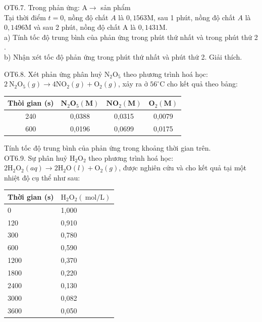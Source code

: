 \documentclass[10pt]{article}
\begin{document}
OT6.7. Trong phản ứng: $\mathrm{A} \rightarrow$ sản phẩm\\
Tại thời điểm $t=0$, nồng độ chất $A$ là $0,1563 \mathrm{M}$, sau 1 phút, nồng độ chất $A$ là $0,1496 \mathrm{M}$ và sau 2 phút, nồng độ chất A là $0,1431 \mathrm{M}$.\\
a) Tính tốc độ trung bình của phản ứng trong phút thứ nhất và trong phút thứ 2 .\\
b) Nhận xét tốc độ phản ứng trong phút thứ nhất và phút thứ 2. Giải thích.

OT6.8. Xét phản ứng phân huỷ $\mathrm{N}_{2} \mathrm{O}_{5}$ theo phương trình hoá học:\\
$2 \mathrm{~N}_{2} \mathrm{O}_{5}(g) \rightarrow 4 \mathrm{NO}_{2}(g)+\mathrm{O}_{2}(g)$, xảy ra ở $56^{\circ} \mathrm{C}$ cho kết quả theo bảng:

\begin{center}
\begin{tabular}{|c|c|c|c|}
\hline
Thòi gian (s) & $\mathbf{N}_{2} \mathbf{O}_{5} \mathbf{( M )}$ & $\mathbf{N O}_{2} \mathbf{( M )}$ & $\mathbf{O}_{2} \mathbf{( M )}$ \\
\hline
240 & 0,0388 & 0,0315 & 0,0079 \\
\hline
600 & 0,0196 & 0,0699 & 0,0175 \\
\hline
\end{tabular}
\end{center}

Tính tốc độ trung bình của phản ứng trong khoảng thời gian trên.\\
OT6.9. Sự phân huỷ $\mathrm{H}_{2} \mathrm{O}_{2}$ theo phương trình hoá học: $2 \mathrm{H}_{2} \mathrm{O}_{2}(a q) \rightarrow 2 \mathrm{H}_{2} \mathrm{O}(l)+\mathrm{O}_{2}(g)$, được nghiên cứu và cho kết quả tại một nhiệt độ cụ thể như sau:

\begin{center}
\begin{tabular}{|l|l|}
\hline
Thời gian (s) & $\mathrm{H}_{2} \mathrm{O}_{2}(\mathrm{~mol} / \mathrm{L})$ \\
\hline
0 & 1,000 \\
\hline
120 & 0,910 \\
\hline
300 & 0,780 \\
\hline
600 & 0,590 \\
\hline
1200 & 0,370 \\
\hline
1800 & 0,220 \\
\hline
2400 & 0,130 \\
\hline
3000 & 0,082 \\
\hline
3600 & 0,050 \\
\hline
\end{tabular}
\end{center}
\end{document}
